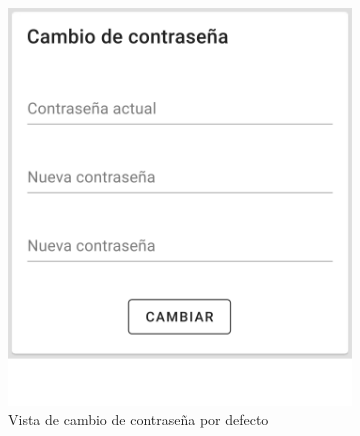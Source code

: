 \begin{itemize}
\begin{figure}[H]
    \centering
    \begin{subfigure}[b]{0.45\textwidth}
        \centering
        \includegraphics[width=\textwidth]{images/app/change-psw-def.png}
        \caption{Vista de cambio de contraseña por defecto \newline}
        \label{fig:app-change-psw_default}
    \end{subfigure}
    \hfill
    \begin{subfigure}[b]{0.45\textwidth}
        \centering

\end{subfigure}
\end{figure}
\end{itemize}
